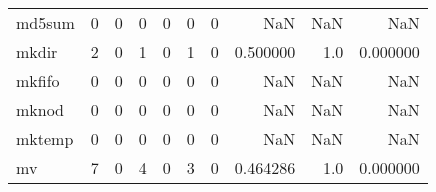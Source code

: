 \begin{longtable}{lrrrrrrrrr}
md5sum    &                                                  0 &                                                  0 &                                                  0 &                                                  0 &                                                  0 &                                                  0 &                                                NaN &                                    NaN &                                  NaN \\
mkdir     &                                                  2 &                                                  0 &                                                  1 &                                                  0 &                                                  1 &                                                  0 &                                           0.500000 &                                    1.0 &                             0.000000 \\
mkfifo    &                                                  0 &                                                  0 &                                                  0 &                                                  0 &                                                  0 &                                                  0 &                                                NaN &                                    NaN &                                  NaN \\
mknod     &                                                  0 &                                                  0 &                                                  0 &                                                  0 &                                                  0 &                                                  0 &                                                NaN &                                    NaN &                                  NaN \\
mktemp    &                                                  0 &                                                  0 &                                                  0 &                                                  0 &                                                  0 &                                                  0 &                                                NaN &                                    NaN &                                  NaN \\
mv        &                                                  7 &                                                  0 &                                                  4 &                                                  0 &                                                  3 &                                                  0 &                                           0.464286 &                                    1.0 &                             0.000000 \\

\end{longtable}
